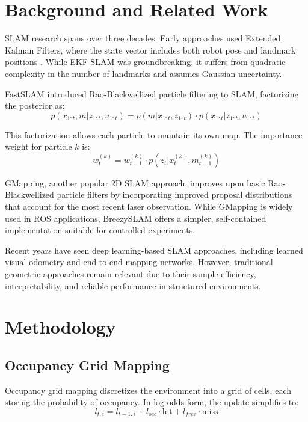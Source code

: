 \documentclass[conference]{IEEEtran}
\begin{document}
  \section{Background and Related Work}

  SLAM research spans over three decades. Early approaches used Extended Kalman Filters, where the state
  vector includes both robot pose and landmark positions \cite{thrun2005}. While EKF-SLAM was
  groundbreaking, it suffers from quadratic complexity in the number of landmarks and assumes Gaussian
  uncertainty.

  FastSLAM \cite{grisetti2007} introduced Rao-Blackwellized particle filtering to SLAM, factorizing the
  posterior as:
  \begin{equation}
  p(x_{1:t}, m | z_{1:t}, u_{1:t}) = p(m | x_{1:t}, z_{1:t}) \cdot p(x_{1:t} | z_{1:t}, u_{1:t})
  \label{eq:rbpf}
  \end{equation}

  This factorization allows each particle to maintain its own map. The importance weight for particle $k$
  is:
  \begin{equation}
  w_t^{(k)} = w_{t-1}^{(k)} \cdot p(z_t | x_t^{(k)}, m_{t-1}^{(k)})
  \label{eq:weight}
  \end{equation}

  GMapping, another popular 2D SLAM approach, improves upon basic Rao-Blackwellized particle filters by
  incorporating improved proposal distributions that account for the most recent laser observation. While
  GMapping is widely used in ROS applications, BreezySLAM offers a simpler, self-contained implementation
  suitable for controlled experiments.

  Recent years have seen deep learning-based SLAM approaches, including learned visual odometry and
  end-to-end mapping networks. However, traditional geometric approaches remain relevant due to their
  sample efficiency, interpretability, and reliable performance in structured environments.

  \section{Methodology}

  \subsection{Occupancy Grid Mapping}

  Occupancy grid mapping discretizes the environment into a grid of cells, each storing the probability of
  occupancy. In log-odds form, the update simplifies to:
  \begin{equation}
  l_{t,i} = l_{t-1,i} + l_{occ} \cdot \text{hit} + l_{free} \cdot \text{miss}
  \label{eq:ogm}
  \end{equation}
\end{document}
